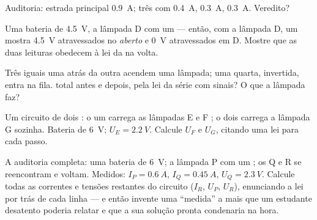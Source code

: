 \begin{exercise}[$\star$]\label{exo:g8:circuit-laws:8}
Auditoria: estrada principal \qty{0.9}{A}; três  com
\qty{0.4}{A}, \qty{0.3}{A}, \qty{0.3}{A}. Veredito?
\end{exercise}

\begin{exercise}[$\star\star$]\label{exo:g8:circuit-laws:9}
Uma bateria de \qty{4.5}{V}, a lâmpada D  com um 
--- então,  com a lâmpada D, um  mostra
\qty{4.5}{V} atravessados no  \emph{aberto} e \qty{0}{V}
atravessados em D. Mostre que as duas leituras obedecem à lei da
 na volta.
\end{exercise}

\begin{exercise}[$\star\star$]\label{exo:g8:circuit-laws:10}
Três  iguais uma atrás da outra acendem uma lâmpada; uma
quarta, invertida, entra na fila.  total antes e depois, pela
lei da série com sinais? O que a lâmpada faz?
\end{exercise}

\begin{exercise}[$\star\star$]\label{exo:g8:circuit-laws:11}
Um circuito de dois : o  um carrega as lâmpadas E e F ; o  dois carrega a lâmpada G sozinha. Bateria de
\qty{6}{V}; $U_E = \qty{2.2}{V}$. Calcule $U_F$ e $U_G$, citando uma
lei para cada passo.
\end{exercise}

\begin{exercise}[$\star\star\star$]\label{exo:g8:circuit-laws:12}
A auditoria completa: uma bateria de \qty{6}{V}; a lâmpada P 
com um ; os  Q e R se reencontram e voltam. Medidos:
$I_P = \qty{0.6}{A}$, $I_Q = \qty{0.45}{A}$, $U_Q = \qty{2.3}{V}$.
Calcule todas as correntes e tensões restantes do circuito ($I_R$,
$U_P$, $U_R$), enunciando a lei por trás de cada linha --- e então
invente uma ``medida'' a mais que um estudante desatento poderia
relatar e que a sua solução pronta condenaria na hora.
\end{exercise}

